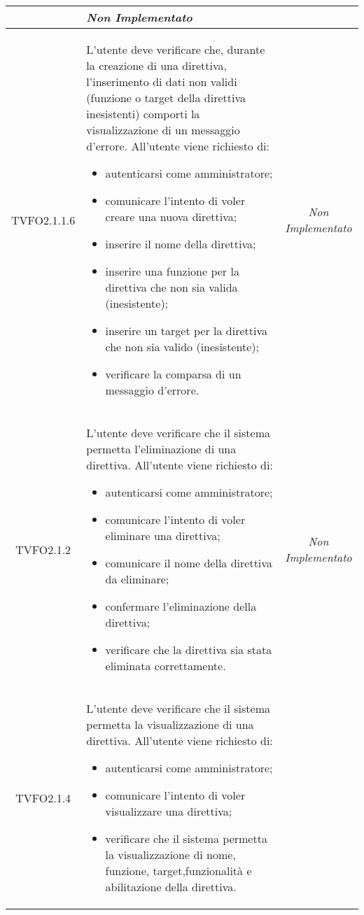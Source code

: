 \begin{longtable}{|c|>{}m{8cm}|c|}
\begin{itemize}
	\end{itemize}
	& \textit{Non Implementato}\\ \hline
	\hypertarget{TVFO2.1.1.6}{TVFO2.1.1.6} & L'utente deve verificare che, durante la creazione di una direttiva, l'inserimento di dati non validi (funzione o target della direttiva inesistenti) comporti la visualizzazione di un messaggio d'errore. All'utente viene richiesto di:
	\begin{itemize}
		\item autenticarsi come amministratore;
		\item comunicare l'intento di voler creare una nuova direttiva;
		\item inserire il nome della direttiva;
		\item inserire una funzione per la direttiva che non sia valida (inesistente);
		\item inserire un target per la direttiva che non sia valido (inesistente);
		\item verificare la comparsa di un messaggio d'errore.
	\end{itemize} & \textit{Non Implementato}\\ \hline
	\hypertarget{TVFO2.1.2}{TVFO2.1.2} & L'utente deve verificare che il sistema permetta l'eliminazione di una direttiva. All'utente viene richiesto di:
	\begin{itemize}
		\item autenticarsi come amministratore;
		\item comunicare l'intento di voler eliminare una direttiva;
		\item comunicare il nome della direttiva da eliminare;
		\item confermare l'eliminazione della direttiva;
		\item verificare che la direttiva sia stata eliminata correttamente.
	\end{itemize}
	& \textit{Non Implementato}\\ \hline
	\hypertarget{TVFO2.1.4}{TVFO2.1.4} & L'utente deve verificare che il sistema permetta la visualizzazione di una direttiva. All'utente viene richiesto di:
	\begin{itemize}
		\item autenticarsi come amministratore;
		\item comunicare l'intento di voler visualizzare una direttiva;
		\item verificare che il sistema permetta la visualizzazione di nome, funzione, target,funzionalità e abilitazione della direttiva.

\end{itemize}
\end{longtable}
